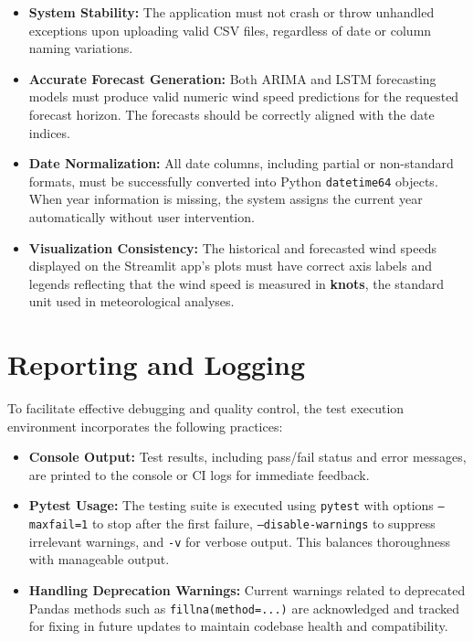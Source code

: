 \begin{itemize}
	\item \textbf{System Stability:}  
	The application must not crash or throw unhandled exceptions upon uploading valid CSV files, regardless of date or column naming variations.
	
	\item \textbf{Accurate Forecast Generation:}  
	Both ARIMA and LSTM forecasting models must produce valid numeric wind speed predictions for the requested forecast horizon. The forecasts should be correctly aligned with the date indices.
	
	\item \textbf{Date Normalization:}  
	All date columns, including partial or non-standard formats, must be successfully converted into Python \texttt{datetime64} objects. When year information is missing, the system assigns the current year automatically without user intervention.
	
	\item \textbf{Visualization Consistency:}  
	The historical and forecasted wind speeds displayed on the Streamlit app’s plots must have correct axis labels and legends reflecting that the wind speed is measured in \textbf{knots}, the standard unit used in meteorological analyses.
\end{itemize}

\section{Reporting and Logging}
To facilitate effective debugging and quality control, the test execution environment incorporates the following practices:

\begin{itemize}
	\item \textbf{Console Output:}  
	Test results, including pass/fail status and error messages, are printed to the console or CI logs for immediate feedback.
	
	\item \textbf{Pytest Usage:}  
	The testing suite is executed using \texttt{pytest} with options \texttt{--maxfail=1} to stop after the first failure, \texttt{--disable-warnings} to suppress irrelevant warnings, and \texttt{-v} for verbose output. This balances thoroughness with manageable output.
	
	\item \textbf{Handling Deprecation Warnings:}  
	Current warnings related to deprecated Pandas methods such as \texttt{fillna(method=...)} are acknowledged and tracked for fixing in future updates to maintain codebase health and compatibility.
\end{itemize}

